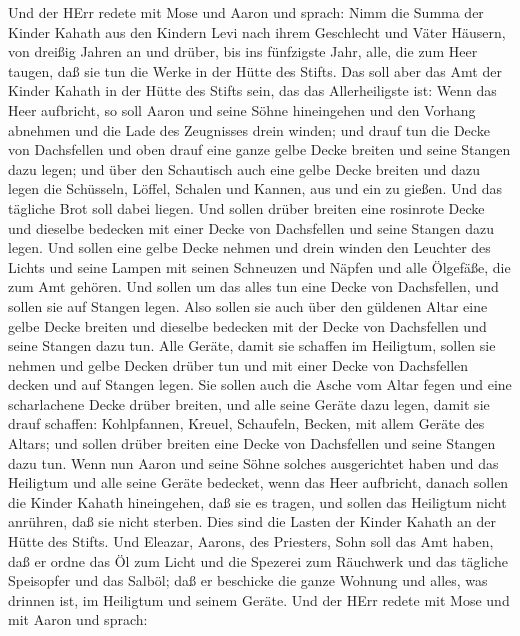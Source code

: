  Und der HErr redete mit Mose und Aaron und sprach:
 Nimm die Summa der Kinder Kahath aus den Kindern Levi nach
ihrem Geschlecht und Väter Häusern,  von dreißig Jahren an
und drüber, bis ins fünfzigste Jahr, alle, die zum Heer taugen, daß sie
tun die Werke in der Hütte des Stifts.  Das soll aber das
Amt der Kinder Kahath in der Hütte des Stifts sein, das das
Allerheiligste ist:  Wenn das Heer aufbricht, so soll Aaron
und seine Söhne hineingehen und den Vorhang abnehmen und die Lade des
Zeugnisses drein winden;  und drauf tun die Decke von
Dachsfellen und oben drauf eine ganze gelbe Decke breiten und seine
Stangen dazu legen;  und über den Schautisch auch eine gelbe
Decke breiten und dazu legen die Schüsseln, Löffel, Schalen und Kannen,
aus und ein zu gießen. Und das tägliche Brot soll dabei liegen.
 Und sollen drüber breiten eine rosinrote Decke und dieselbe
bedecken mit einer Decke von Dachsfellen und seine Stangen dazu legen.
 Und sollen eine gelbe Decke nehmen und drein winden den
Leuchter des Lichts und seine Lampen mit seinen Schneuzen und Näpfen und
alle Ölgefäße, die zum Amt gehören.  Und sollen um das
alles tun eine Decke von Dachsfellen, und sollen sie auf Stangen legen.
 Also sollen sie auch über den güldenen Altar eine gelbe
Decke breiten und dieselbe bedecken mit der Decke von Dachsfellen und
seine Stangen dazu tun.  Alle Geräte, damit sie schaffen im
Heiligtum, sollen sie nehmen und gelbe Decken drüber tun und mit einer
Decke von Dachsfellen decken und auf Stangen legen.  Sie
sollen auch die Asche vom Altar fegen und eine scharlachene Decke drüber
breiten,  und alle seine Geräte dazu legen, damit sie drauf
schaffen: Kohlpfannen, Kreuel, Schaufeln, Becken, mit allem Geräte des
Altars; und sollen drüber breiten eine Decke von Dachsfellen und seine
Stangen dazu tun.  Wenn nun Aaron und seine Söhne solches
ausgerichtet haben und das Heiligtum und alle seine Geräte bedecket,
wenn das Heer aufbricht, danach sollen die Kinder Kahath hineingehen,
daß sie es tragen, und sollen das Heiligtum nicht anrühren, daß sie
nicht sterben. Dies sind die Lasten der Kinder Kahath an der Hütte des
Stifts.  Und Eleazar, Aarons, des Priesters, Sohn soll das
Amt haben, daß er ordne das Öl zum Licht und die Spezerei zum Räuchwerk
und das tägliche Speisopfer und das Salböl; daß er beschicke die ganze
Wohnung und alles, was drinnen ist, im Heiligtum und seinem Geräte.
 Und der HErr redete mit Mose und mit Aaron und sprach:
